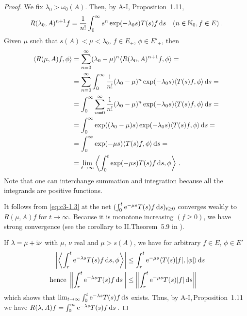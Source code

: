 \begin{proof}
	We fix $\lambda_{0} > \omega_0(A)$.
	Then, by A-I,  Proposition~1.11,
	\begin{equation}\label{eq:c3-1.2}
		R(\lambda_{0},A)^{n+1}f = \frac{1}{n!} \int_{0}^{\infty} s^n \exp(-\lambda_{0}s) T(s)f \mathop{}\!\mathrm{d}{s}  \quad (n \in \mathbb{N}_{0}, f \in E)\,.
	\end{equation}
	Given $\mu$ such that $s(A) < \mu < \lambda_{0}$, $f \in E_{+}$, $\phi \in E'_{+}$, then
	\begin{equation}\label{eq:c3-1.3}
	\begin{aligned}
		\langle R(\mu,A)f,\phi\rangle &= \sum_{n=0}^{\infty} (\lambda_{0}-\mu)^n\langle R(\lambda_{0},A)^{n+1}f,\phi\rangle = \\
		&= \sum_{n=0}^{\infty} \int_{0}^{\infty} \frac{1}{n!}(\lambda_{0}-\mu)^n\exp(-\lambda_{0}s)\langle T(s)f,\phi\rangle\mathop{}\!\mathrm{d}{s} = \\
		&= \int_{0}^{\infty} \sum_{n=0}^{\infty} \frac{1}{n!}(\lambda_{0}-\mu)^n\exp(-\lambda_{0}s)\langle T(s)f,\phi\rangle\mathop{}\!\mathrm{d}{s} = \\
		&= \int_{0}^{\infty} \exp((\lambda_{0}-\mu)s)\exp(-\lambda_{0}s)\langle T(s)f,\phi\rangle\mathop{}\!\mathrm{d}{s} = \\
		&= \int_{0}^{\infty} \exp(-\mu s)\langle T(s)f,\phi\rangle\mathop{}\!\mathrm{d}{s} = \\ & = \lim_{t\to\infty}\left\langle \int_{0}^t \exp(-\mu s)T(s)f \mathop{}\!\mathrm{d}{s},\phi\right\rangle\,.
	\end{aligned}
	\end{equation}
	Note that one can interchange summation and integration because all the integrands are positive functions.
	
	It follows from \eqref{eq:c3-1.3} at the net $(\int_{0}^t \mathrm{e}^{-\mu s}T(s) f \mathop{}\!\mathrm{d}{s} )_{t\geq 0}$ converges weakly to $R(\mu,A)f$ for $t \to \infty$.
	Because it is monotone increasing $(f \geq 0)$, we have strong convergence (see the corollary to II.Theorem~5.9 in \citet{schaefer:1974}).

If $\lambda = \mu + \mathrm{i}\nu$ with $\mu$, $\nu$ real and $\mu > s(A)$, we have for arbitrary $f \in E$, $\phi \in E'$
\begin{align*}
	\left|\left\langle \int_{r}^t \mathrm{e}^{-\lambda s}T(s)f \mathop{}\!\mathrm{d}{s} ,\phi\right\rangle\right| &\leq \int_{r}^t \mathrm{e}^{-\mu s}\langle T(s)|f|,|\phi|\rangle\mathop{}\!\mathrm{d}{s} \\
	\text{ hence } \left\|\int_{r}^t \mathrm{e}^{-\lambda s}T(s)f \mathop{}\!\mathrm{d}{s} \right\| &\leq \left\|\int_{r}^t \mathrm{e}^{-\mu s}T(s)|f| \mathop{}\!\mathrm{d}{s} \right\| \
\end{align*}
which shows that $\lim_{t\to\infty} \int_{0}^t \mathrm{e}^{-\lambda s}T(s)f \mathop{}\!\mathrm{d}{s} $ exists.
Thus, by A-I,\,Proposition~1.11 we have  $R(\lambda,A)f = \int_{0}^{\infty} \mathrm{e}^{-\lambda s} T(s)f \mathop{}\!\mathrm{d}{s} $\,. 


\end{proof}
